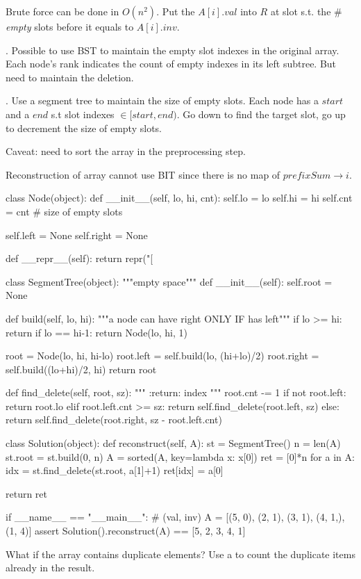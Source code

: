 Brute force can be done in $O(n^2)$. Put the $A[i].val$ into $R$ at slot s.t. the \# \textit{empty} slots before it equals to $A[i].inv$.

. Possible to use BST to maintain the empty slot indexes in the original array. Each node's rank indicates the count of empty indexes in its left subtree. But need to maintain the deletion.  

. Use a segment tree to maintain the size of empty slots. Each node has a $start$ and a $end$ s.t slot indexes $\in [start, end)$. Go down to find the target slot, go up to decrement the size of empty slots. 

Caveat: need to sort the array in the preprocessing step. 

Reconstruction of array cannot use BIT since there is no map of $prefixSum \rightarrow i$.
\newpage
\begin{python}
class Node(object):
  def __init__(self, lo, hi, cnt):
    self.lo = lo
    self.hi = hi
    self.cnt = cnt  # size of empty slots

    self.left = None
    self.right = None

  def __repr__(self):
    return repr("[%


class SegmentTree(object):
  """empty space"""
  def __init__(self):
    self.root = None

  def build(self, lo, hi):
    """a node can have right ONLY IF has left"""
    if lo >= hi: return
    if lo == hi-1: return Node(lo, hi, 1)

    root = Node(lo, hi, hi-lo)
    root.left = self.build(lo, (hi+lo)/2)
    root.right = self.build((lo+hi)/2, hi)
    return root

  def find_delete(self, root, sz):
    """
    :return: index
    """
    root.cnt -= 1
    if not root.left:
      return root.lo
    elif root.left.cnt >= sz:
      return self.find_delete(root.left, sz)
    else:
      return self.find_delete(root.right,
                  sz - root.left.cnt)


class Solution(object):
  def reconstruct(self, A):
    st = SegmentTree()
    n = len(A)
    st.root = st.build(0, n)
    A = sorted(A, key=lambda x: x[0])
    ret = [0]*n
    for a in A:
      idx = st.find_delete(st.root, a[1]+1)
      ret[idx] = a[0]

    return ret


if __name__ == "__main__":
  # (val, inv)
  A = [(5, 0), (2, 1), (3, 1), (4, 1,), (1, 4)]
  assert Solution().reconstruct(A) == [5, 2, 3, 4, 1]
\end{python}

 What if the array contains duplicate elements? Use a  to count the duplicate items already in the result. 
